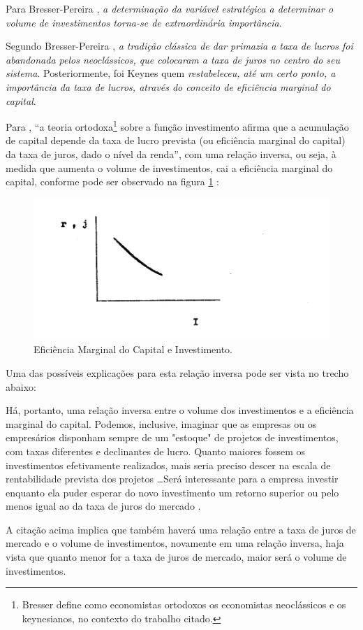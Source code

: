 \documentclass[
	12pt,				%
	oneside,			%
	a4paper,			%
	chapter=TITLE,		%
	section=TITLE,		%
	english,			%
	brazil				%
	]{abntex2}
\begin{document}
Para Bresser-Pereira \autocite*[3]{Bresser-Pereira1973}, \emph{a determinação da variável
estratégica a determinar o volume de investimentos torna-se de extraordinária
importância}.

Segundo Bresser-Pereira \autocite*[3]{Bresser-Pereira1973}, \emph{a tradição clássica de dar
primazia a taxa de lucros foi abandonada pelos neoclássicos, que colocaram a
taxa de juros no centro do seu sistema}. Posteriormente, foi Keynes quem
\emph{restabeleceu, até um certo ponto, a importância da taxa de lucros, através do
conceito de eficiência marginal do capital}.

Para \textcite{Bresser-Pereira1973}, ``a teoria ortodoxa\footnote{Bresser define como economistas ortodoxos os economistas neoclássicos e os
  keynesianos, no contexto do trabalho citado.} sobre a função investimento
afirma que a acumulação de capital depende da taxa de lucro prevista (ou
eficiência marginal do capital) da taxa de juros, dado o nível da renda'', com
uma relação inversa, ou seja, à medida que aumenta o volume de investimentos,
cai a eficiência marginal do capital, conforme pode ser observado na
figura \ref{fig:eficienciamarginal} \autocite[4]{Bresser-Pereira1973}:
\begin{figure}[H]

{\centering \includegraphics[width=0.8\linewidth]{images/Page-4-Image-1} 

}

\caption{Eficiência Marginal do Capital e Investimento.}\label{fig:eficienciamarginal}
\end{figure}
Uma das possíveis explicações para esta relação inversa pode ser vista no trecho
abaixo:
\begin{citacao}
Há, portanto, uma relação inversa entre o volume dos investimentos e a
eficiência marginal do capital. Podemos, inclusive, imaginar que as empresas ou
os empresários disponham sempre de um "estoque" de projetos de investimentos,
com taxas diferentes e declinantes de lucro. Quanto maiores fossem os
investimentos efetivamente realizados, mais seria preciso descer na escala de
rentabilidade prevista dos projetos \ldots Será interessante para a empresa
investir enquanto ela puder esperar do novo investimento um retorno superior ou
pelo menos igual ao da taxa de juros do mercado
\cite[p.~5]{Bresser-Pereira1973}.
\end{citacao}
A citação acima implica que também haverá uma relação entre a taxa de juros de
mercado e o volume de investimentos, novamente em uma relação inversa, haja
vista que quanto menor for a taxa de juros de mercado, maior será o volume de
investimentos.
\end{document}
